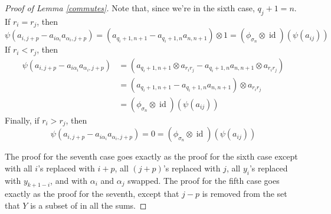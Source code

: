 \documentclass[11pt]{amsart}
\def\ltblue{blue!20!white}
\def\s{{\sigma}}
\def\a{\alpha}
\newcommand\id{\operatorname{id}}
\newcommand\Sp{\Sigma^{(p)}}
\begin{document}
\begin{proof} [Proof of Lemma \ref{commutes}]
\noindent Note that, since we're in the sixth case, $q_j + 1 = n$.  If $r_i = r_j$, then 
$$\psi\left(a_{i,j+p} - a_{i\a_i}a_{\a_i,j+p}\right) = \left(a_{q_i+1,n+1} - a_{q_i+1,n}a_{n,n+1}\right)\otimes 1 = (\phi_{\s_n} \otimes \id)(\psi(a_{ij}))$$
If $r_i < r_j$, then
\begin{align*}
\psi\left(a_{i,j+p} - a_{i\a_i}a_{\a_i,j+p}\right) &= \left(a_{q_i+1,n+1}\otimes a_{r_ir_j} - a_{q_i+1,n}a_{n,n+1}\otimes a_{r_ir_j}\right)\\
&= \left(a_{q_i+1,n+1} - a_{q_i+1,n}a_{n,n+1}\right)\otimes a_{r_ir_j}\\
&= (\phi_{\s_n} \otimes \id)(\psi(a_{ij}))
\end{align*}
Finally, if $r_i > r_j$, then
$$\psi\left(a_{i,j+p} - a_{i\a_i}a_{\a_i,j+p}\right) = 0 = (\phi_{\s_n} \otimes \id)(\psi(a_{ij}))$$

The proof for the seventh case goes exactly as the proof for the sixth case except with all $i$'s replaced with $i+p$, all $(j+p)$'s replaced with $j$, all $y_i$'s replaced with $y_{k+1-i}$, and with $\a_i$ and $\a_j$ swapped.  The proof for the fifth case goes exactly as the proof for the seventh, except that $j-p$ is removed from the set that $Y$ is a subset of in all the sums.\todo[color=\ltblue]{check this}


%
%
%

\end{proof}
\end{document}
